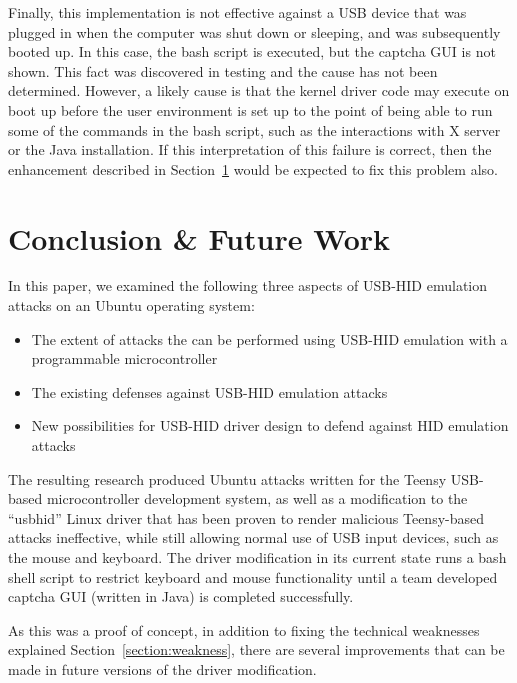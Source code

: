 \documentclass[pagenumbers]{ieee}
\begin{document}
Finally, this implementation is not effective against a USB device that was plugged in when the computer was shut down or sleeping, and was subsequently booted up.  In this case, the bash script is executed, but the captcha GUI is not shown. This fact was discovered in testing and the cause has not been determined. However, a likely cause is that the kernel driver code may execute on boot up before the user environment is set up to the point of being able to run some of the commands in the bash script, such as the interactions with X server or the Java installation. If this interpretation of this failure is correct, then the enhancement described in Section~\ref{section:conclusion} would be expected to fix this problem also.


\section{Conclusion \& Future Work}
\label{section:conclusion}

In this paper, we examined the following three aspects of USB-HID emulation attacks on an Ubuntu operating system:

\begin{itemize}
\item The extent of attacks the can be performed using USB-HID emulation with a programmable microcontroller
\item The existing defenses against USB-HID emulation attacks
\item New possibilities for USB-HID driver design to defend against HID emulation attacks
\end{itemize}

The resulting research produced Ubuntu attacks written for the Teensy USB-based microcontroller development system, as well as a modification to the ``usbhid'' Linux driver that has been proven to render malicious Teensy-based attacks ineffective, while still allowing normal use of USB input devices, such as the mouse and keyboard. The driver modification in its current state runs a bash shell script to restrict keyboard and mouse functionality until a team developed captcha GUI (written in Java) is completed successfully.

As this was a proof of concept, in addition to fixing the technical weaknesses explained Section~\ref{section:weakness}, there are several improvements that can be made in future versions of the driver modification.
\end{document}
